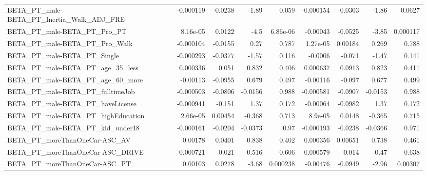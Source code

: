 \begin{tabular}{lrrrrrrrr}
BETA\_PT\_male-BETA\_PT\_Inertia\_Walk\_ADJ\_FRE          &   -0.000119 &      -0.0238 &    -1.89 &    0.059 &  -0.000154 &     -0.0303 &        -1.86 &        0.0627 \\
BETA\_PT\_male-BETA\_PT\_Pro\_PT                        &    8.16e-05 &       0.0122 &     -4.5 & 6.86e-06 &   -0.00043 &     -0.0525 &        -3.85 &      0.000117 \\
BETA\_PT\_male-BETA\_PT\_Pro\_Walk                      &   -0.000104 &      -0.0155 &     0.27 &    0.787 &   1.27e-05 &     0.00184 &        0.269 &         0.788 \\
BETA\_PT\_male-BETA\_PT\_Single                        &   -0.000293 &      -0.0377 &    -1.57 &    0.116 &    -0.0006 &      -0.071 &        -1.47 &         0.141 \\
BETA\_PT\_male-BETA\_PT\_age\_35\_less                   &    0.000336 &        0.051 &    0.832 &    0.406 &   0.000637 &      0.0913 &        0.823 &         0.411 \\
BETA\_PT\_male-BETA\_PT\_age\_60\_more                   &    -0.00113 &      -0.0955 &    0.679 &    0.497 &   -0.00116 &      -0.097 &        0.677 &         0.499 \\
BETA\_PT\_male-BETA\_PT\_fulltimeJob                   &   -0.000503 &      -0.0806 &  -0.0156 &    0.988 &  -0.000581 &     -0.0907 &      -0.0153 &         0.988 \\
BETA\_PT\_male-BETA\_PT\_haveLicense                   &   -0.000941 &       -0.151 &     1.37 &    0.172 &   -0.00064 &     -0.0982 &         1.37 &         0.172 \\
BETA\_PT\_male-BETA\_PT\_highEducation                 &    2.66e-05 &      0.00454 &   -0.368 &    0.713 &    8.9e-05 &      0.0148 &       -0.365 &         0.715 \\
BETA\_PT\_male-BETA\_PT\_kid\_under18                   &   -0.000161 &      -0.0204 &  -0.0373 &     0.97 &  -0.000193 &     -0.0238 &      -0.0366 &         0.971 \\
BETA\_PT\_moreThanOneCar-ASC\_AV                      &     0.00178 &       0.0401 &    0.838 &    0.402 &   0.000356 &     0.00651 &        0.738 &         0.461 \\
BETA\_PT\_moreThanOneCar-ASC\_DRIVE                   &    0.000721 &        0.021 &   -0.516 &    0.606 &   0.000579 &       0.014 &        -0.47 &         0.638 \\
BETA\_PT\_moreThanOneCar-ASC\_PT                      &     0.00103 &       0.0278 &    -3.68 & 0.000238 &   -0.00476 &     -0.0949 &        -2.96 &       0.00307 \\

\end{tabular}
